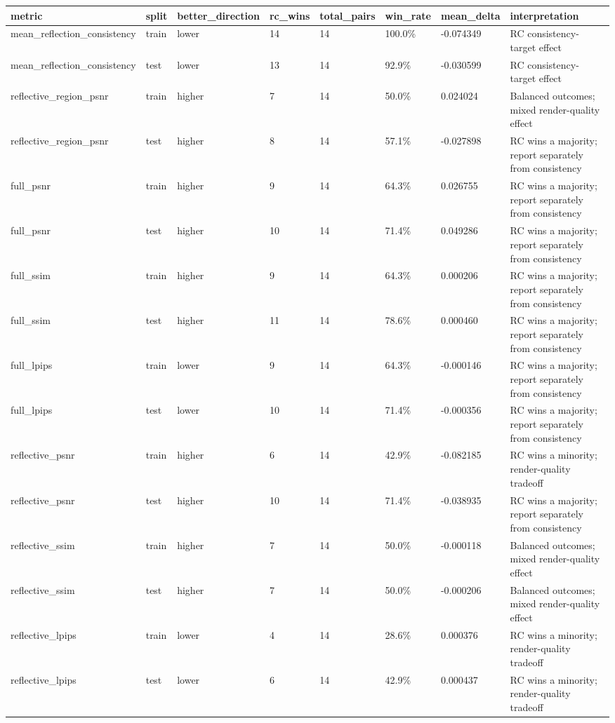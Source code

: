 \begin{tabular}{llllllll}
\toprule
metric & split & better\_direction & rc\_wins & total\_pairs & win\_rate & mean\_delta & interpretation \\
\midrule
mean\_reflection\_consistency & train & lower & 14 & 14 & 100.0\% & -0.074349 & RC consistency-target effect \\
mean\_reflection\_consistency & test & lower & 13 & 14 & 92.9\% & -0.030599 & RC consistency-target effect \\
reflective\_region\_psnr & train & higher & 7 & 14 & 50.0\% & 0.024024 & Balanced outcomes; mixed render-quality effect \\
reflective\_region\_psnr & test & higher & 8 & 14 & 57.1\% & -0.027898 & RC wins a majority; report separately from consistency \\
full\_psnr & train & higher & 9 & 14 & 64.3\% & 0.026755 & RC wins a majority; report separately from consistency \\
full\_psnr & test & higher & 10 & 14 & 71.4\% & 0.049286 & RC wins a majority; report separately from consistency \\
full\_ssim & train & higher & 9 & 14 & 64.3\% & 0.000206 & RC wins a majority; report separately from consistency \\
full\_ssim & test & higher & 11 & 14 & 78.6\% & 0.000460 & RC wins a majority; report separately from consistency \\
full\_lpips & train & lower & 9 & 14 & 64.3\% & -0.000146 & RC wins a majority; report separately from consistency \\
full\_lpips & test & lower & 10 & 14 & 71.4\% & -0.000356 & RC wins a majority; report separately from consistency \\
reflective\_psnr & train & higher & 6 & 14 & 42.9\% & -0.082185 & RC wins a minority; render-quality tradeoff \\
reflective\_psnr & test & higher & 10 & 14 & 71.4\% & -0.038935 & RC wins a majority; report separately from consistency \\
reflective\_ssim & train & higher & 7 & 14 & 50.0\% & -0.000118 & Balanced outcomes; mixed render-quality effect \\
reflective\_ssim & test & higher & 7 & 14 & 50.0\% & -0.000206 & Balanced outcomes; mixed render-quality effect \\
reflective\_lpips & train & lower & 4 & 14 & 28.6\% & 0.000376 & RC wins a minority; render-quality tradeoff \\
reflective\_lpips & test & lower & 6 & 14 & 42.9\% & 0.000437 & RC wins a minority; render-quality tradeoff \\
\bottomrule
\end{tabular}
